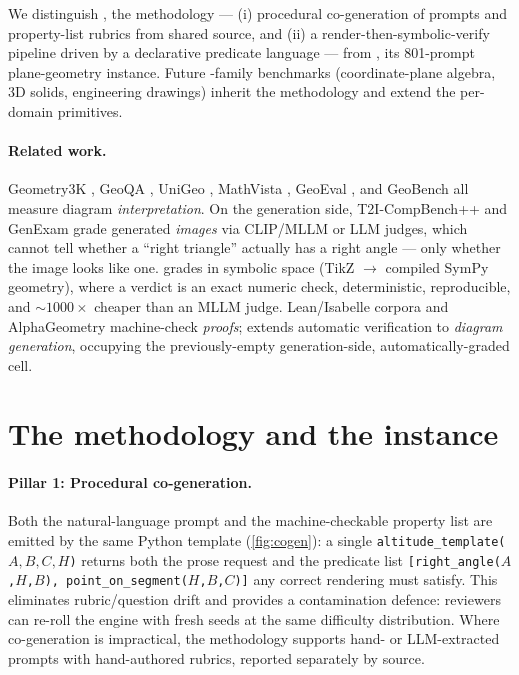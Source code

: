 \documentclass{article}
\begin{document}
We distinguish \textbf{\GeoGen}, the methodology --- (i) procedural co-generation of prompts and property-list rubrics from shared source, and (ii) a render-then-symbolic-verify pipeline driven by a declarative predicate language --- from \textbf{\GeoGenBench}, its 801-prompt plane-geometry instance.
Future \GeoGen-family benchmarks (coordinate-plane algebra, 3D solids, engineering drawings) inherit the methodology and extend the per-domain primitives.

\paragraph{Related work.}
Geometry3K \citep{lu2021intergps}, GeoQA \citep{chen2021geoqa}, UniGeo \citep{chen2022unigeo}, MathVista \citep{lu2024mathvista}, GeoEval \citep{zhang2024geoeval}, and GeoBench \citep{geobench2026} all measure diagram \emph{interpretation}.
On the generation side, T2I-CompBench++ \citep{huang2025t2icompbenchpp} and GenExam \citep{wang2025genexam} grade generated \emph{images} via CLIP/MLLM or LLM judges, which cannot tell whether a ``right triangle'' actually has a right angle --- only whether the image looks like one.
\GeoGenBench grades in symbolic space (TikZ $\to$ compiled SymPy geometry), where a  verdict is an exact numeric check, deterministic, reproducible, and $\sim$$1000\times$ cheaper than an MLLM judge.
Lean/Isabelle corpora and AlphaGeometry \citep{trinh2024alphageometry} machine-check \emph{proofs}; \GeoGenBench extends automatic verification to \emph{diagram generation}, occupying the previously-empty generation-side, automatically-graded cell.

\section{The \GeoGen methodology and the \GeoGenBench instance}
\label{sec:design}

\paragraph{Pillar 1: Procedural co-generation.}
Both the natural-language prompt and the machine-checkable property list are emitted by the same Python template (\cref{fig:cogen}): a single \texttt{altitude\_template($A,B,C,H$)} returns both the prose request and the predicate list \texttt{[right\_angle($A$,$H$,$B$), point\_on\_segment($H$,$B$,$C$)]} any correct rendering must satisfy.
This eliminates rubric/question drift and provides a contamination defence: reviewers can re-roll the engine with fresh seeds at the same difficulty distribution.
Where co-generation is impractical, the methodology supports hand- or LLM-extracted prompts with hand-authored rubrics, reported separately by source.
\end{document}
